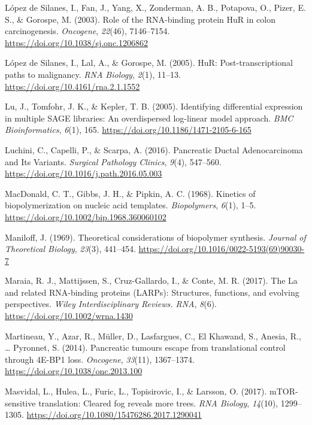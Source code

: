 \documentclass[12pt,openany]{book}
\begin{document}
\hypertarget{ref-LopezdeSilanes2003}{}
López de Silanes, I., Fan, J., Yang, X., Zonderman, A. B., Potapova, O.,
Pizer, E. S., \& Gorospe, M. (2003). Role of the RNA-binding protein HuR
in colon carcinogenesis. \emph{Oncogene}, \emph{22}(46), 7146--7154.
\url{https://doi.org/10.1038/sj.onc.1206862}

\hypertarget{ref-LopezdeSilanes2005}{}
López de Silanes, I., Lal, A., \& Gorospe, M. (2005). HuR:
Post-transcriptional paths to malignancy. \emph{RNA Biology},
\emph{2}(1), 11--13. \url{https://doi.org/10.4161/rna.2.1.1552}

\hypertarget{ref-Lu2005}{}
Lu, J., Tomfohr, J. K., \& Kepler, T. B. (2005). Identifying
differential expression in multiple SAGE libraries: An overdispersed
log-linear model approach. \emph{BMC Bioinformatics}, \emph{6}(1), 165.
\url{https://doi.org/10.1186/1471-2105-6-165}

\hypertarget{ref-Luchini2016}{}
Luchini, C., Capelli, P., \& Scarpa, A. (2016). Pancreatic Ductal
Adenocarcinoma and Its Variants. \emph{Surgical Pathology Clinics},
\emph{9}(4), 547--560. \url{https://doi.org/10.1016/j.path.2016.05.003}

\hypertarget{ref-MacDonald1968}{}
MacDonald, C. T., Gibbs, J. H., \& Pipkin, A. C. (1968). Kinetics of
biopolymerization on nucleic acid templates. \emph{Biopolymers},
\emph{6}(1), 1--5. \url{https://doi.org/10.1002/bip.1968.360060102}

\hypertarget{ref-Maniloff1969}{}
Maniloff, J. (1969). Theoretical considerations of biopolymer synthesis.
\emph{Journal of Theoretical Biology}, \emph{23}(3), 441--454.
\url{https://doi.org/10.1016/0022-5193(69)90030-7}

\hypertarget{ref-Maraia2017}{}
Maraia, R. J., Mattijssen, S., Cruz-Gallardo, I., \& Conte, M. R.
(2017). The La and related RNA-binding proteins (LARPs): Structures,
functions, and evolving perspectives. \emph{Wiley Interdisciplinary
Reviews. RNA}, \emph{8}(6). \url{https://doi.org/10.1002/wrna.1430}

\hypertarget{ref-Martineau2014}{}
Martineau, Y., Azar, R., Müller, D., Lasfargues, C., El Khawand, S.,
Anesia, R., \ldots{} Pyronnet, S. (2014). Pancreatic tumours escape from
translational control through 4E-BP1 loss. \emph{Oncogene},
\emph{33}(11), 1367--1374. \url{https://doi.org/10.1038/onc.2013.100}

\hypertarget{ref-Masvidal2017}{}
Masvidal, L., Hulea, L., Furic, L., Topisirovic, I., \& Larsson, O.
(2017). mTOR-sensitive translation: Cleared fog reveals more trees.
\emph{RNA Biology}, \emph{14}(10), 1299--1305.
\url{https://doi.org/10.1080/15476286.2017.1290041}
\end{document}
